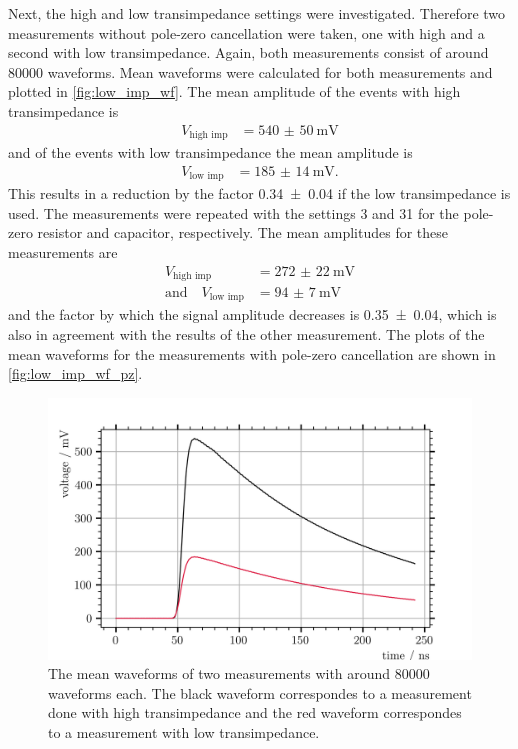 Next, the high and low transimpedance settings were investigated.
Therefore two measurements without pole-zero cancellation were taken, one with high and a second with low transimpedance.
Again, both measurements consist of around \num{80000} waveforms.
Mean waveforms were calculated for both measurements and plotted in \autoref{fig:low_imp_wf}.
The mean amplitude of the events with high transimpedance is
\begin{align}
	V_\text{high imp} &= \SI{540(50)}{\milli\volt}
\end{align}
and of the events with low transimpedance the mean amplitude is
\begin{align}
	V_\text{low imp} &= \SI{185(14)}{\milli\volt}.
\end{align}
This results in a reduction by the factor \num{0.34(4)} if the low transimpedance is used.
The measurements were repeated with the settings 3 and 31 for the pole-zero resistor and capacitor, respectively.
The mean amplitudes for these measurements are
\begin{align}
	V_\text{high imp} &= \SI{272(22)}{\milli\volt}\\
	\text{and}\quad V_\text{low imp} &= \SI{94(7)}{\milli\volt}
\end{align}
and the factor by which the signal amplitude decreases is \num{0.35(4)}, which is also in agreement with the results of the other measurement.
The plots of the mean waveforms for the measurements with pole-zero cancellation are shown in \autoref{fig:low_imp_wf_pz}.
\begin{figure}
	\centering
	\includegraphics[width=1.\textwidth]{pictures/low_imp_mean_wf}
	\caption[Waveforms measured with low and high transimpedance]{The mean waveforms of two measurements with around \num{80000} waveforms each. The black waveform correspondes to a measurement done with high transimpedance and the red waveform correspondes to a measurement with low transimpedance.}
	\label{fig:low_imp_wf}
\end{figure}
